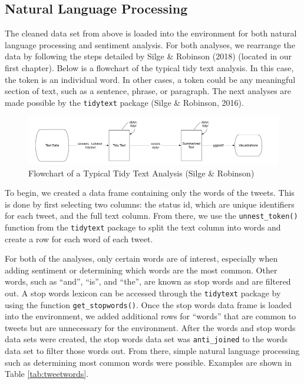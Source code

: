 \documentclass[12pt,twoside]{reedthesis}
\newenvironment{Shaded}{\begin{snugshade}}{\end{snugshade}}
\newcommand{\KeywordTok}[1]{\textcolor[rgb]{0.13,0.29,0.53}{\textbf{#1}}}
\newcommand{\StringTok}[1]{\textcolor[rgb]{0.31,0.60,0.02}{#1}}
\newcommand{\OperatorTok}[1]{\textcolor[rgb]{0.81,0.36,0.00}{\textbf{#1}}}
\newcommand{\NormalTok}[1]{#1}
\begin{document}
\subsection{Natural Language
Processing}\label{natural-language-processing}

The cleaned data set from above is loaded into the environment for both
natural language processing and sentiment analysis. For both analyses,
we rearrange the data by following the steps detailed by Silge \&
Robinson (2018) (located in our first chapter). Below is a flowchart of
the typical tidy text analysis. In this case, the token is an individual
word. In other cases, a token could be any meaningful section of text,
such as a sentence, phrase, or paragraph. The next analyses are made
possible by the \texttt{tidytext} package (Silge \& Robinson, 2016).
\begin{figure}
\includegraphics[width=475px]{tidytext} \caption{Flowchart of a Typical Tidy Text Analysis (Silge \& Robinson)}\label{fig:unnamed-chunk-12}
\end{figure}
To begin, we created a data frame containing only the words of the
tweets. This is done by first selecting two columns: the status id,
which are unique identifiers for each tweet, and the full text column.
From there, we use the \texttt{unnest\_token()} function from the
\texttt{tidytext} package to split the text column into words and create
a row for each word of each tweet.

\small
\begin{Shaded}
\end{Shaded}
\normalsize

For both of the analyses, only certain words are of interest, especially
when adding sentiment or determining which words are the most common.
Other words, such as ``and'', ``is'', and ``the'', are known as stop
words and are filtered out. A stop words lexicon can be accessed through
the \texttt{tidytext} package by using the function
\texttt{get\_stopwords()}. Once the stop words data frame is loaded into
the environment, we added additional rows for ``words'' that are common
to tweets but are unnecessary for the environment. After the words and
stop words data sets were created, the stop words data set was
\texttt{anti\_joined} to the words data set to filter those words out.
From there, simple natural language processing such as determining most
common words were possible. Examples are shown in Table
\ref{tab:tweetwords}.
\end{document}
